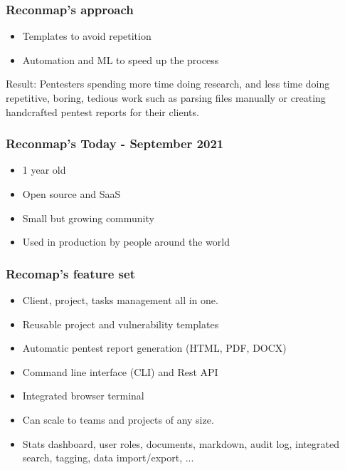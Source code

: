 \documentclass{beamer}
\begin{document}
\begin{frame}
	\frametitle{Reconmap's approach}
	
	\begin{itemize}
		\item Templates to avoid repetition
		\item Automation and ML to speed up the process
	\end{itemize}
	
	\begin{block}{Result:}
		Pentesters spending more time doing research, and less time doing repetitive, boring, tedious work such as parsing files manually or creating handcrafted pentest reports for their clients.	
	\end{block}
\end{frame}


\begin{frame}
	\frametitle{Reconmap's Today - September 2021}
	
	\begin{itemize}
		\item 1 year old
		\item Open source and SaaS
		\item Small but growing community
		\item Used in production by people around the world
	\end{itemize}
\end{frame}

\begin{frame}{}
	\frametitle{Recomap's feature set}
	
    \begin{itemize}
        \item Client, project, tasks management all in one.
        \item Reusable project and vulnerability templates
        \item Automatic pentest report generation (HTML, PDF, DOCX)
        \item Command line interface (CLI) and Rest API
        \item Integrated browser terminal
        \item Can scale to teams and projects of any size.
        \item Stats dashboard, user roles, documents, markdown, audit log, integrated search, tagging, data import/export, ...
    \end{itemize}
\end{frame}
\end{document}
